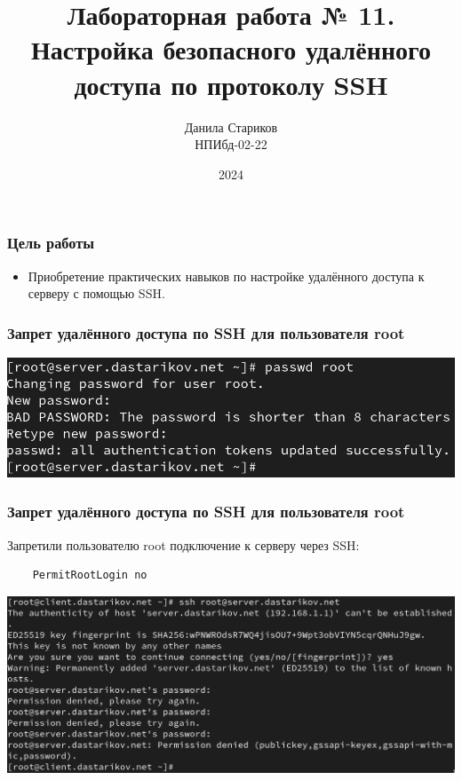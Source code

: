 

\title{Лабораторная работа № 11. \\ Настройка безопасного удалённого доступа по протоколу SSH}
\author{Данила Стариков \\ НПИбд-02-22}
\date{2024}



\frame{\titlepage}

\begin{frame}
\frametitle{Цель работы}
\begin{itemize}
    \item Приобретение практических навыков по настройке удалённого доступа к серверу с помощью SSH.
\end{itemize}
\end{frame}

\begin{frame}
\frametitle{Запрет удалённого доступа по SSH для пользователя root}
  \centering
  \includegraphics[width=\textwidth]{../images/image01.png}
\end{frame}

\begin{frame}[fragile]
\frametitle{Запрет удалённого доступа по SSH для пользователя root}
Запретили пользователю root подключение к серверу через SSH:
  \begin{verbatim}
    PermitRootLogin no
  \end{verbatim}
  \centering
  \includegraphics[width=\textwidth]{../images/image02.png}
\end{frame}

